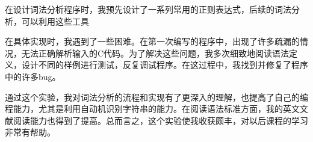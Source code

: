 \documentclass[lang=cn,11pt,a4paper]{elegantpaper}
\begin{document}
在设计词法分析程序时，我预先设计了一系列常用的正则表达式，后续的词法分析，可以利用这些工具

在具体实现时，我遇到了一些困难。在第一次编写的程序中，出现了许多疏漏的情况，无法正确解析输入的C代码。为了解决这些问题，我多次细致地阅读语法定义，设计不同的样例进行测试，反复调试程序。在这过程中，我找到并修复了程序中的许多bug。

通过这个实验，我对词法分析的流程和实现有了更深入的理解，也提高了自己的编程能力，尤其是利用自动机识别字符串的能力。在阅读语法标准方面，我的英文文献阅读能力也得到了提高。总而言之，这个实验使我收获颇丰，对以后课程的学习非常有帮助。






\end{document}
